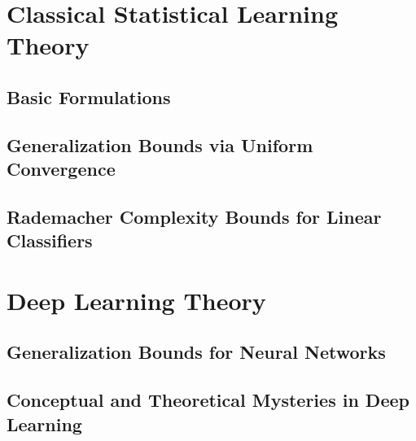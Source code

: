 \documentclass[oneside, openany]{book}
\theoremstyle{definition}
\theoremstyle{remark}
\numberwithin{section}{chapter}
\numberwithin{equation}{chapter}
\begin{document}
	\part{Classical Statistical Learning Theory}\label{part:supervised}
	
	\chapter{Basic Formulations}\label{chap:supervised}
	
%	
%	
%
%	

	\chapter{Generalization Bounds via Uniform Convergence}\label{chap:uc}
	
	
 
%	
	\chapter{Rademacher Complexity Bounds for Linear Classifiers}\label{chap:gen-bounds}
	
	
%	

\part{Deep Learning Theory}	

\chapter{Generalization Bounds for Neural Networks} \label{chap:gen-bounds-nns}


\chapter{Conceptual and Theoretical Mysteries in Deep Learning}\label{chap:dl-overview}

\end{document}
